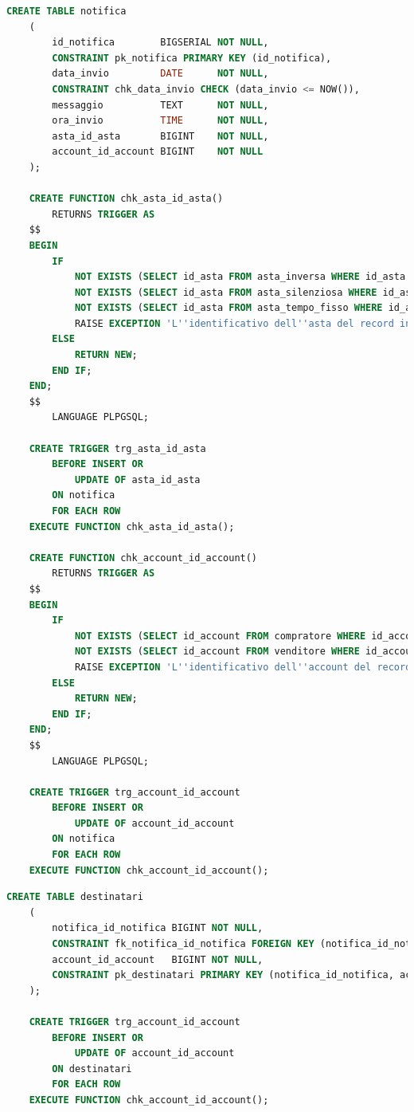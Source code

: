 \begin{lstlisting}[language=SQL, caption=Relazione notifica]
    CREATE TABLE notifica
    (
        id_notifica        BIGSERIAL NOT NULL,
        CONSTRAINT pk_notifica PRIMARY KEY (id_notifica),
        data_invio         DATE      NOT NULL,
        CONSTRAINT chk_data_invio CHECK (data_invio <= NOW()),
        messaggio          TEXT      NOT NULL,
        ora_invio          TIME      NOT NULL,
        asta_id_asta       BIGINT    NOT NULL,
        account_id_account BIGINT    NOT NULL
    );
    
    CREATE FUNCTION chk_asta_id_asta()
        RETURNS TRIGGER AS
    $$
    BEGIN
        IF
            NOT EXISTS (SELECT id_asta FROM asta_inversa WHERE id_asta = NEW.asta_id_asta) AND
            NOT EXISTS (SELECT id_asta FROM asta_silenziosa WHERE id_asta = NEW.asta_id_asta) AND
            NOT EXISTS (SELECT id_asta FROM asta_tempo_fisso WHERE id_asta = NEW.asta_id_asta) THEN
            RAISE EXCEPTION 'L''identificativo dell''asta del record inserito non referenzia un''asta esistente';
        ELSE
            RETURN NEW;
        END IF;
    END;
    $$
        LANGUAGE PLPGSQL;
    
    CREATE TRIGGER trg_asta_id_asta
        BEFORE INSERT OR
            UPDATE OF asta_id_asta
        ON notifica
        FOR EACH ROW
    EXECUTE FUNCTION chk_asta_id_asta();
    
    CREATE FUNCTION chk_account_id_account()
        RETURNS TRIGGER AS
    $$
    BEGIN
        IF
            NOT EXISTS (SELECT id_account FROM compratore WHERE id_account = NEW.id_account) AND
            NOT EXISTS (SELECT id_account FROM venditore WHERE id_account = NEW.id_account) THEN
            RAISE EXCEPTION 'L''identificativo dell''account del record inserito non referenzia un account esistente';
        ELSE
            RETURN NEW;
        END IF;
    END;
    $$
        LANGUAGE PLPGSQL;
    
    CREATE TRIGGER trg_account_id_account
        BEFORE INSERT OR
            UPDATE OF account_id_account
        ON notifica
        FOR EACH ROW
    EXECUTE FUNCTION chk_account_id_account();
\end{lstlisting}

\begin{lstlisting}[language=SQL, caption=Relazione destinatari]
    CREATE TABLE destinatari
    (
        notifica_id_notifica BIGINT NOT NULL,
        CONSTRAINT fk_notifica_id_notifica FOREIGN KEY (notifica_id_notifica) REFERENCES notifica (id_notifica) ON UPDATE CASCADE ON DELETE CASCADE,
        account_id_account   BIGINT NOT NULL,
        CONSTRAINT pk_destinatari PRIMARY KEY (notifica_id_notifica, account_id_account)
    );
    
    CREATE TRIGGER trg_account_id_account
        BEFORE INSERT OR
            UPDATE OF account_id_account
        ON destinatari
        FOR EACH ROW
    EXECUTE FUNCTION chk_account_id_account();
\end{lstlisting}

